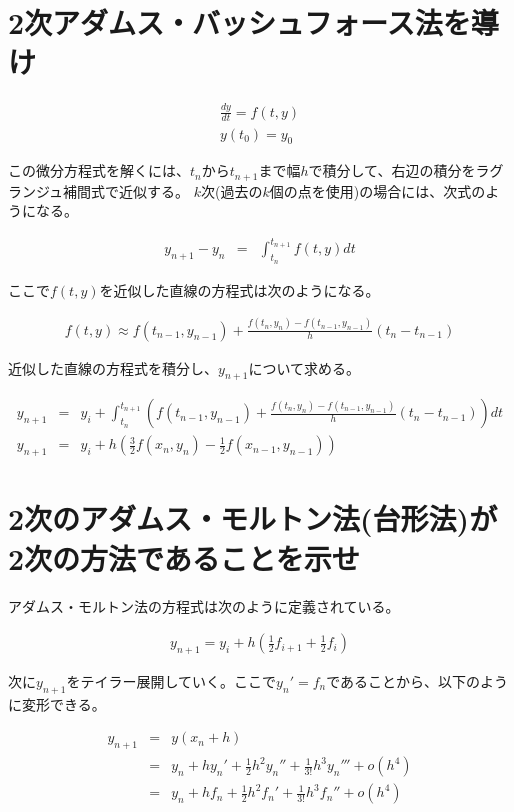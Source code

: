 \documentclass[]{jsarticle}
\begin{document}
\section{2次アダムス・バッシュフォース法を導け}

\begin{eqnarray*}
\frac{dy}{dt} = f(t,y)\\
y(t_{0}) = y_{0}
\end{eqnarray*}

この微分方程式を解くには、$t_{n}$から$t_{n+1}$まで幅$h$で積分して、右辺の積分をラグランジュ補間式で近似する。
$k$次(過去の$k$個の点を使用)の場合には、次式のようになる。

\begin{eqnarray*}
y_{n+1} - y_{n} &=& \int_{t_{n}}^{t_{n+1}} f(t,y) dt
\end{eqnarray*}

ここで$f(t,y)$を近似した直線の方程式は次のようになる。

\begin{eqnarray*}
f(t, y) \approx f(t_{n-1}, y_{n-1}) + \frac{f(t_{n}, y_{n}) - f(t_{n-1}, y_{n-1})}{h}(t_{n}-t_{n-1})
\end{eqnarray*}

近似した直線の方程式を積分し、$y_{n+1}$について求める。

\begin{eqnarray*}
y_{n+1} &=& y_{i} + \int_{t_{n}}^{t_{n+1}}\left(f(t_{n-1}, y_{n-1}) + \frac{f(t_{n}, y_{n}) - f(t_{n-1}, y_{n-1})}{h}(t_{n}-t_{n-1})\right)dt\\
y_{n+1} &=& y_{i} + h\left(\frac{3}{2} f(x_{n}, y_{n}) - \frac{1}{2} f(x_{n-1}, y_{n-1})\right)
\end{eqnarray*}


\section{2次のアダムス・モルトン法(台形法)が2次の方法であることを示せ}

アダムス・モルトン法の方程式は次のように定義されている。

\begin{eqnarray*}
y_{n+1} = y_{i} + h(\frac{1}{2} f_{i+1} + \frac{1}{2} f_{i})
\end{eqnarray*}

次に$y_{n+1}$をテイラー展開していく。ここで$y_{n}' = f_{n}$であることから、以下のように変形できる。

\begin{eqnarray*}
y_{n+1} &=& y(x_{n} + h)\\
 &=& y_{n} + h y_{n}' + \frac{1}{2} h^{2} y_{n}'' + \frac{1}{3!} h^{3} y_{n}''' + o(h^{4})\\
 &=& y_{n} + h f_{n} + \frac{1}{2} h^{2} f_{n}' + \frac{1}{3!} h^{3} f_{n}'' + o(h^{4})
\end{eqnarray*}
\end{document}
